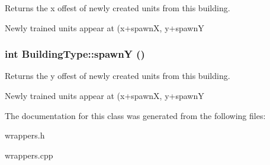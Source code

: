 Returns the x offest of newly created units from this building.

Newly trained units appear at (x+spawnX, y+spawnY \hypertarget{classBuildingType_2eb4a10f9714a1947b33354a7eb59d5d}{
\subsubsection[{spawnY}]{\setlength{\rightskip}{0pt plus 5cm}int BuildingType::spawnY ()}}
\label{classBuildingType_2eb4a10f9714a1947b33354a7eb59d5d}


Returns the y offest of newly created units from this building.

Newly trained units appear at (x+spawnX, y+spawnY 

The documentation for this class was generated from the following files:\begin{CompactItemize}
\item 
wrappers.h\item 
wrappers.cpp\end{CompactItemize}
